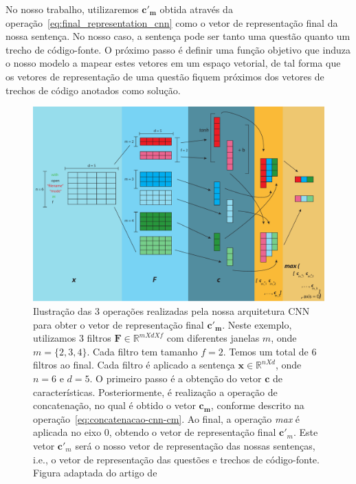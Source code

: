 No nosso trabalho, utilizaremos $\bm{c'}_{\bm{m}}$ obtida através da operação~\ref{eq:final_representation_cnn} como o vetor de representação final da nossa sentença. No nosso caso, a sentença pode ser tanto uma questão quanto um trecho de código-fonte. O próximo passo é definir uma função objetivo que induza o nosso modelo a mapear estes vetores em um espaço vetorial, de tal forma que os vetores de representação de uma questão fiquem próximos dos vetores de trechos de código anotados como solução.

\begin{figure}[h]
    \centering
    \includegraphics[width=1\textwidth]{figuras/cap-problema/cnn-architecture.pdf}
    \caption{Ilustração das 3 operações realizadas pela nossa arquitetura CNN para obter o vetor de representação final $\bm{c'}_{\bm{m}}$. Neste exemplo, utilizamos 3 filtros $\bm{F} \in \mathbb{R}^{m X d X f}$ com diferentes janelas $m$, onde $m = \{2, 3, 4\}$. Cada filtro tem tamanho $f = 2$. Temos um total de 6 filtros ao final. Cada filtro é aplicado a sentença $\bm{x} \in \mathbb{R}^{n X d}$, onde $n = 6$ e $d = 5$. O primeiro passo é a obtenção do vetor $\bm{c}$ de características. Posteriormente, é realização a operação de concatenação, no qual é obtido o vetor $\bm{c}_{\bm{m}}$, conforme descrito na operação~\ref{eq:concatenacao-cnn-cm}. Ao final, a operação \textit{max} é aplicada no eixo $0$, obtendo o vetor de representação final $\bm{c'}_{m}$. Este vetor $\bm{c'}_{m}$ será o nosso vetor de representação das nossas sentenças, i.e., o vetor de representação das questões e trechos de código-fonte. Figura adaptada do artigo de \cite{zhang-guide-convolutional-cnn-embedding-ilustration:2015}}
    \label{fig:cnn-architecture-proposal}
\end{figure}




